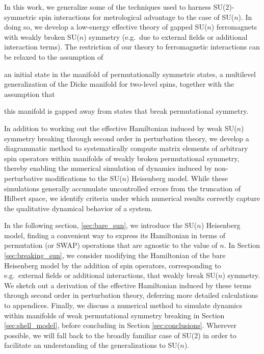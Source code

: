 \documentclass[nofootinbib,notitlepage,11pt]{revtex4-2}
\newcommand{\1}{\mathds{1}}
\begin{document}
In this work, we generalize some of the techniques used to harness SU(2)-symmetric spin interactions for metrological advantage to the case of SU($n$).
In doing so, we develop a low-energy effective theory of gapped SU($n$) ferromagnets with weakly broken SU($n$) symmetry (e.g.~due to external fields or additional interaction terms).
The restriction of our theory to ferromagnetic interactions can be relaxed to the assumption of
\begin{enumerate*}
\item an initial state in the manifold of permutationally symmetric states, a multilevel generalization of the Dicke manifold for two-level spins, together with the assumption that
\item this manifold is gapped away from states that break permutational symmetry.
\end{enumerate*}
In addition to working out the effective Hamiltonian induced by weak SU($n$) symmetry breaking through second order in perturbation theory, we develop a diagrammatic method to systematically compute matrix elements of arbitrary spin operators within manifolds of weakly broken permutational symmetry, thereby enabling the numerical simulation of dynamics induced by non-perturbative modifications to the SU($n$) Heisenberg model.
While these simulations generally accumulate uncontrolled errors from the truncation of Hilbert space, we identify criteria under which numerical results correctly capture the qualitative dynamical behavior of a system.

In the following section, \ref{sec:bare_sun}, we introduce the SU($n$) Heisenberg model, finding a convenient way to express its Hamiltonian in terms of permutation (or SWAP) operations that are agnostic to the value of $n$.
In Section \ref{sec:breaking_sun}, we consider modifying the Hamiltonian of the bare Heisenberg model by the addition of spin operators, corresponding to e.g.~external fields or additional interactions, that weakly break SU($n$) symmetry.
We sketch out a derivation of the effective Hamiltonian induced by these terms through second order in perturbation theory, deferring more detailed calculations to appendices.
Finally, we discuss a numerical method to simulate dynamics within manifolds of weak permutational symmetry breaking in Section \ref{sec:shell_model}, before concluding in Section \ref{sec:conclusions}.
Wherever possible, we will fall back to the broadly familiar case of SU(2) in order to facilitate an understanding of the generalizations to SU($n$).
\end{document}
